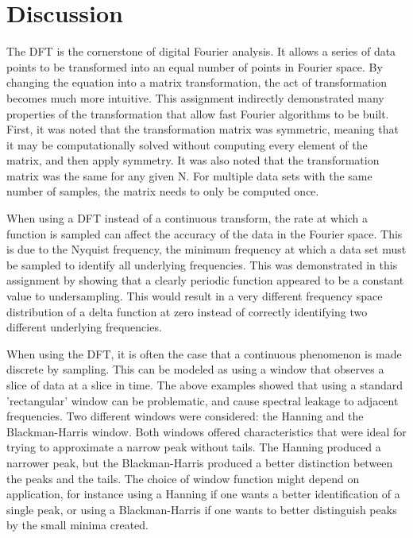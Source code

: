 \documentclass[twocolumn]{article}
\begin{document}
\section{Discussion}
The DFT is the cornerstone of digital Fourier analysis. It allows a series of data points to be transformed into an equal number of points in Fourier space. By changing the equation into a matrix transformation, the act of transformation becomes much more intuitive. This assignment indirectly demonstrated many properties of the transformation that allow fast Fourier algorithms to be built. First, it was noted that the transformation matrix was symmetric, meaning that it may be computationally solved without computing every element of the matrix, and then apply symmetry. It was also noted that the transformation matrix was the same for any given N. For multiple data sets with the same number of samples, the matrix needs to only be computed once. 

When using a DFT instead of a continuous transform, the rate at which a function is sampled can affect the accuracy of the data in the Fourier space. This is due to the Nyquist frequency, the minimum frequency at which a data set must be sampled to identify all underlying frequencies. This was demonstrated in this assignment by showing that a clearly periodic function appeared to be a constant value to undersampling. This would result in a very different frequency space distribution of a delta function at zero instead of correctly identifying two different underlying frequencies.

When using the DFT, it is often the case that a continuous phenomenon is made discrete by sampling. This can be modeled as using a window that observes a slice of data at a slice in time. The above examples showed that using a standard 'rectangular' window can be problematic, and cause spectral leakage to adjacent frequencies. Two different windows were considered: the Hanning and the Blackman-Harris window. Both windows offered characteristics that were ideal for trying to approximate a narrow peak without tails. The Hanning produced a narrower peak, but the Blackman-Harris produced a better distinction between the peaks and the tails. The choice of window function might depend on application, for instance using a Hanning if one wants a better identification of a single peak, or using a Blackman-Harris if one wants to better distinguish peaks by the small minima created.
\end{document}
